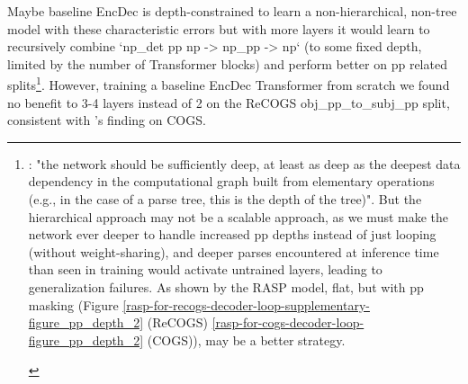 \documentclass[11pt]{article}
\begin{document}
Maybe \cite{Wu2023} baseline EncDec is depth-constrained to learn a non-hierarchical, non-tree model with these characteristic errors but with more layers it would learn to recursively combine `np\_det pp np -> np\_pp -> np` (to some fixed depth, limited by the number of Transformer blocks) and perform better on pp related splits\footnote{\begin{footnotesize}\cite{Csordas2022}: "the network should be sufficiently deep, at least as deep as the deepest data dependency in the computational graph built from elementary operations (e.g., in the case of a parse tree, this is the depth of the tree)". But the hierarchical approach may not be a scalable approach, as we must make the network ever deeper to handle increased pp depths instead of just looping (without weight-sharing), and deeper parses encountered at inference time than seen in training would activate untrained layers, leading to generalization failures. As shown by the RASP model, flat, but with pp masking (Figure \ref{rasp-for-recogs-decoder-loop-supplementary-figure_pp_depth_2} (ReCOGS) \ref{rasp-for-cogs-decoder-loop-figure_pp_depth_2} (COGS)), may be a better strategy.\end{footnotesize}}. However, training a \cite{Wu2023} baseline EncDec Transformer from scratch we found no benefit to 3-4 layers instead of 2 on the ReCOGS obj\_pp\_to\_subj\_pp split, consistent with \cite{petty2024impactdepthcompositionalgeneralization}'s finding on COGS.
\end{document}
